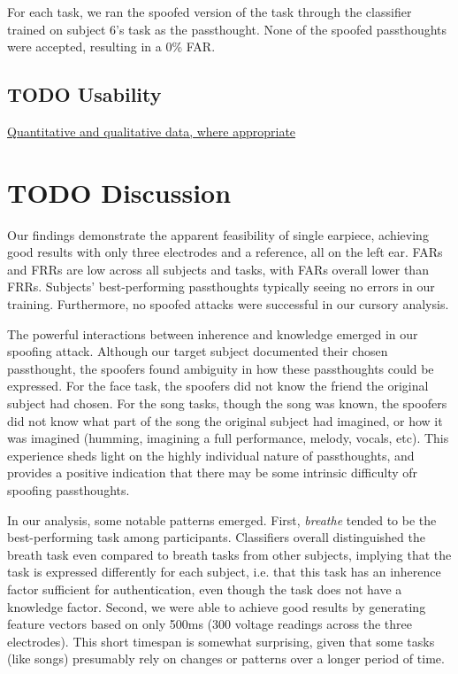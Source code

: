 \documentclass[letterpaper,twocolumn,10pt]{article}
\begin{document}
For each task, we ran the spoofed version of the task through the classifier trained on subject 6's task as the passthought.
None of the spoofed passthoughts were accepted, resulting in a 0\% FAR.


\subsection{{\bfseries\sffamily TODO} Usability}
\label{sec:org18d5968}

\underline{Quantitative and qualitative data, where appropriate}

\section{{\bfseries\sffamily TODO} Discussion}

Our findings demonstrate the apparent feasibility of single earpiece, achieving good results with only three electrodes and a reference, all on the left ear. FARs and FRRs are low across all subjects and tasks, with FARs overall lower than FRRs. Subjects' best-performing passthoughts typically seeing no errors in our training. Furthermore, no spoofed attacks were successful in our cursory analysis.

The powerful interactions between inherence and knowledge emerged in our spoofing attack. Although our target subject documented their chosen passthought, the spoofers found ambiguity in how these passthoughts could be expressed. For the face task, the spoofers did not know the friend the original subject had chosen. For the song tasks, though the song was known, the spoofers did not know what part of the song the original subject had imagined, or how it was imagined (humming, imagining a full performance, melody, vocals, etc). This experience sheds light on the highly individual nature of passthoughts, and provides a positive indication that there may be some intrinsic difficulty ofr spoofing passthoughts.

In our analysis, some notable patterns emerged. First, \textit{breathe} tended to be the best-performing task among participants. Classifiers overall distinguished the breath task even compared to breath tasks from other subjects, implying that the task is expressed differently for each subject, i.e. that this task has an inherence factor sufficient for authentication, even though the task does not have a knowledge factor. Second, we were able to achieve good results by generating feature vectors based on only 500ms (300 voltage readings across the three electrodes). This short timespan is somewhat surprising, given that some tasks (like songs) presumably rely on changes or patterns over a longer period of time. 
\end{document}
